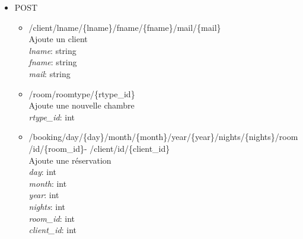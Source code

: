 \documentclass{article}
\begin{document}
\begin{itemize}
\begin{itemize}
	\item /client/id/\{id\}/lname/\{lname\}\\
		Met \`a jour le nom de famille d'un client \\
		\textit{id}: int \\
		\textit{lname}: string

	\item /client/id/\{id\}/mail/\{mail\}\\
		Met \`a jour le mail d'un client \\
		\textit{id}: int \\
		\textit{mail}: string

	\item /booking/id/\{id\}/state/\{state\} \\
		Met \`a jour la r\'eservation \\
		\textit{id}: int \\
		\textit{state}: int

	\item /room/id/\{id\}/roomtype/\{rtype\_id\} \\
		Met \`a jour une chambre \\
		\textit{id}: int \\
		\textit{rtype\_id}: int

	\item /room/id/\{id\}/price/\{price\} \\
		Modifie le prix d'une chambre \\
		\textit{id}: int \\
		\textit{price}: int \\
	\end{itemize}

\item POST
	\begin{itemize}

		\item /client/lname/\{lname\}/fname/\{fname\}/mail/\{mail\}\\
		Ajoute un client \\
		\textit{lname}: string \\
		\textit{fname}: string \\
		\textit{mail}: string

	\item /room/roomtype/\{rtype\_id\}\\
		Ajoute une nouvelle chambre \\
		\textit{rtype\_id}: int

	\item /booking/day/\{day\}/month/\{month\}/year/\{year\}/nights/\{nights\}/room/id/\{room\_id\}- /client/id/\{client\_id\}\\
		Ajoute une r\'eservation \\
		\textit{day}: int \\
		\textit{month}: int \\
		\textit{year}: int \\
		\textit{nights}: int \\
		\textit{room\_id}: int \\
		\textit{client\_id}: int


\end{itemize}
\end{itemize}
\end{document}
